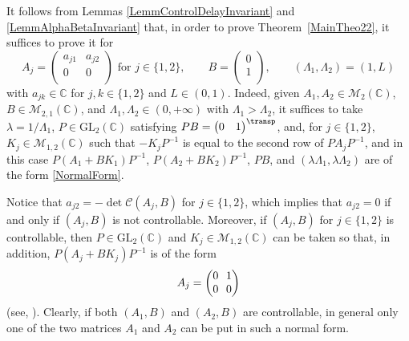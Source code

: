 \begin{remk}
\label{RemkReduction}
It follows from Lemmas \ref{LemmControlDelayInvariant} and \ref{LemmAlphaBetaInvariant} that, in order to prove Theorem~\ref{MainTheo22}, it suffices to prove it for
\begin{equation}
\label{NormalForm}
A_j = \begin{pmatrix}
a_{j1} & a_{j2} \\
0 & 0 \\
\end{pmatrix} \text{ for } j \in \{1, 2\}, \qquad B = \begin{pmatrix}
0 \\
1 \\
\end{pmatrix}, \qquad (\Lambda_1, \Lambda_2) = (1, L)
\end{equation}
with $a_{jk} \in \mathbb C$ for $j, k \in \{1, 2\}$ and $L \in (0, 1)$. Indeed, given $A_1, A_2 \in \mathcal M_2(\mathbb C)$, $B \in \mathcal M_{2, 1}(\mathbb C)$, and $\Lambda_1, \Lambda_2 \in (0, +\infty)$ with $\Lambda_1 > \Lambda_2$, it suffices to take $\lambda = 1/\Lambda_1$, $P \in \mathrm{GL}_2(\mathbb C)$ satisfying $P B = \begin{pmatrix}0 & 1 \\\end{pmatrix}^\transp$, and, for $j \in \{1, 2\}$, $K_j \in \mathcal M_ {1, 2}(\mathbb C)$ such that $-K_j P^{-1}$ is equal to the second row of $P A_j P^{-1}$, and in this case $P(A_1 + B K_1)P^{-1}$, \hbox{$P(A_2 + B K_2)P^{-1}$}, $P B$, and $(\lambda \Lambda_1, \lambda \Lambda_2)$ are of the form \eqref{NormalForm}.

Notice that $a_{j2} = -\det\mathcal C(A_j, B)$ for $j \in \{1, 2\}$, which implies that $a_{j2} =0$ if and only if $(A_j,B)$ is not controllable.
Moreover, if $(A_j,B)$ for $j\in\{1,2\}$ is controllable, then $P \in \mathrm{GL}_2(\mathbb C)$ and $K_j \in \mathcal M_{1, 2}(\mathbb C)$ can be taken so that, in addition,
\hbox{$P (A_j + B K_j) P^{-1}$} is of the form
\begin{equation*}\arraycolsep3.5pt
A_j = \begin{pmatrix}
0 & 1 \\
0 & 0 \\
\end{pmatrix} \end{equation*}
(see, \eg \cite[Def.\,5.1.5]{Sontag1998Mathematical}). Clearly, if both $(A_1,B)$ and $(A_2,B)$ are controllable, in general only one of the two matrices $A_1$ and $A_2$ can be put in such a normal form.


\end{remk}
